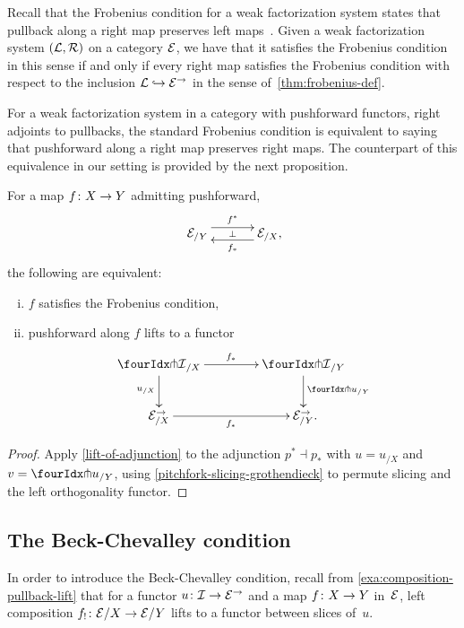 \documentclass[reqno,10pt,a4paper,oneside,draft]{amsart}
\begin{document}
\begin{remark} Recall that the Frobenius condition for a weak factorization system states that pullback along a right map preserves left maps~\cite{garner:types-omega-groupoids,gambino-garner:idtypewfs}. Given a weak factorization system $(\cal{L}, \cal{R})$ on a category $\catE$, we have that it satisfies the Frobenius condition  in this sense if and only if every right map satisfies the Frobenius condition with respect to the inclusion $\cal{L} \hookrightarrow \catE^\to$
in the sense of~\cref{thm:frobenius-def}.
\end{remark} 


For a weak factorization system in a category with pushforward functors, \ie right adjoints to pullbacks, the standard Frobenius condition is equivalent to saying that pushforward along a right map preserves right maps.
The counterpart of this equivalence in our setting is provided by the next proposition.

\begin{proposition} \label{lift-pushforward}
For a map $f \co X \to Y$ admitting pushforward,
\[
\xymatrix@C+1em{
  \catE_{/Y}
  \ar@<5pt>[r]^{f^*}
  \ar@{}[r]|{\bot}
&
  \catE_{/X}
  \ar@<5pt>[l]^{f_*}
\rlap{,}}
\]
the following are equivalent:
\begin{enumerate}[(i)]
\item $f$ satisfies the Frobenius condition,
\item pushforward along $f$ lifts to a functor
\[
\xymatrix@C=1.5cm{
  {\liftr{\cal{I}}}_{/X}
  \ar[r]^{f_*}
  \ar[d]_{u_{/X}}
&
  {\liftr{\cal{I}}}_{/Y}
  \ar[d]^{{\liftr{u}}_{/Y}}
\\
  \catE_{/X}^\to
  \ar[r]_{f_*}
&
  \catE_{/Y}^\to
\rlap{.}}
\]

\end{enumerate}
\end{proposition}

\begin{proof}
Apply \cref{lift-of-adjunction} to the adjunction $p^* \dashv p_*$ with $u = u_{/X}$ and $v = {\liftr{u}}_{/Y}$, using \cref{pitchfork-slicing-grothendieck} to permute slicing and the left orthogonality functor.
\end{proof}

\subsection*{The Beck-Chevalley condition}

In order to introduce the Beck-Chevalley condition, recall from \cref{exa:composition-pullback-lift} that for a functor $u \co \cal{I} \to \catE^\to$ and a map $f \co X \to Y$ in~$\catE$, left composition $f_! \co \calE/X \to \calE/Y$ lifts to a functor between slices of~$u$.
\end{document}
